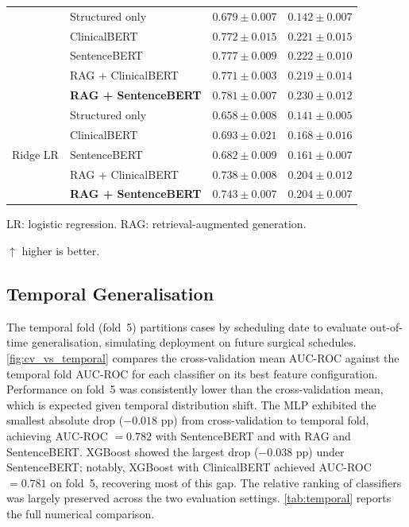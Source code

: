\begin{table}[ht]
\begin{threeparttable}
\begin{tabular}{llrr}
  & Structured only       & $0.679 \pm 0.007$ & $0.142 \pm 0.007$ \\
  & ClinicalBERT          & $0.772 \pm 0.015$ & $0.221 \pm 0.015$ \\
  & SentenceBERT          & $0.777 \pm 0.009$ & $0.222 \pm 0.010$ \\
  & RAG + ClinicalBERT    & $0.771 \pm 0.003$ & $0.219 \pm 0.014$ \\
  & \textbf{RAG + SentenceBERT} & $\mathbf{0.781 \pm 0.007}$ & $\mathbf{0.230 \pm 0.012}$ \\
\midrule
\multirow{5}{*}{Ridge LR}
  & Structured only       & $0.658 \pm 0.008$ & $0.141 \pm 0.005$ \\
  & ClinicalBERT          & $0.693 \pm 0.021$ & $0.168 \pm 0.016$ \\
  & SentenceBERT          & $0.682 \pm 0.009$ & $0.161 \pm 0.007$ \\
  & RAG + ClinicalBERT    & $0.738 \pm 0.008$ & $0.204 \pm 0.012$ \\
  & \textbf{RAG + SentenceBERT} & $\mathbf{0.743 \pm 0.007}$ & $\mathbf{0.204 \pm 0.007}$ \\
\bottomrule
\end{tabular}
\begin{tablenotes}
  \footnotesize
  \item LR: logistic regression. RAG: retrieval-augmented generation.
  \item $\uparrow$ higher is better.
\end{tablenotes}
\end{threeparttable}
\end{table}

\subsection{Temporal Generalisation}
\label{sec:temporal}

The temporal fold (fold~5) partitions cases by scheduling date to evaluate
out-of-time generalisation, simulating deployment on future surgical schedules.
\cref{fig:cv_vs_temporal} compares the cross-validation mean AUC-ROC against
the temporal fold AUC-ROC for each classifier on its best feature
configuration.  Performance on fold~5 was consistently lower than the
cross-validation mean, which is expected given temporal distribution shift.
The MLP exhibited the smallest absolute drop ($-0.018$ pp) from cross-validation
to temporal fold, achieving AUC-ROC $= 0.782$ with SentenceBERT and with RAG
and SentenceBERT.  XGBoost showed the largest drop ($-0.038$ pp) under
SentenceBERT; notably, XGBoost with ClinicalBERT achieved AUC-ROC $= 0.781$
on fold~5, recovering most of this gap.  The relative ranking of classifiers
was largely preserved across the two evaluation settings.
\cref{tab:temporal} reports the full numerical comparison.

